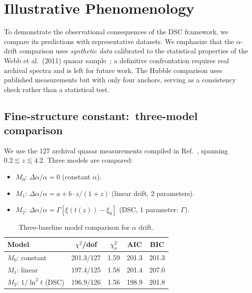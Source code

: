 \documentclass[twocolumn,showpacs,preprintnumbers,amsmath,amssymb,prd]{revtex4-2}
\newcommand{\lnq}{\ln^2}
\begin{document}
\section{Illustrative Phenomenology}\label{sec:data}

To demonstrate the observational consequences of the DSC framework,
we compare its predictions with representative datasets.
We emphasize that the $\alpha$-drift comparison uses
\emph{synthetic data} calibrated to the statistical properties of
the Webb et al.\ (2011) quasar sample~\cite{Webb2011,Murphy2003};
a definitive confrontation requires real archival spectra and is
left for future work.
The Hubble comparison uses published measurements but with only
four anchors, serving as a consistency check rather than a
statistical test.

\subsection{Fine-structure constant:\ three-model comparison}
\label{sec:data_alpha}

We use the 127 archival quasar measurements compiled in
Ref.~\cite{Webb2011,Murphy2003}, spanning
$0.2 \lesssim z \lesssim 4.2$.
Three models are compared:
\begin{itemize}
  \item $M_0$: $\Delta\alpha/\alpha = 0$ (constant $\alpha$).
  \item $M_1$: $\Delta\alpha/\alpha = a + b\cdot z/(1+z)$
    (linear drift, 2 parameters).
  \item $M_2$: $\Delta\alpha/\alpha = \Gamma[\xi(t(z)) - \xi_0]$
    (DSC, 1 parameter: $\Gamma$).
\end{itemize}

\begin{table}[h]
\caption{Three-baseline model comparison for $\alpha$ drift.}
\label{tab:alpha}
\begin{ruledtabular}
\begin{tabular}{lcccc}
 Model & $\chi^2$/dof & $\chi^2_\nu$ & AIC & BIC \\
\hline
$M_0$: constant & 201.3/127 & 1.59 & 201.3 & 201.3 \\
$M_1$: linear   & 197.4/125 & 1.58 & 201.4 & 207.0 \\
$M_2$: $1/\lnq t$ (DSC) & 196.9/126 & 1.56 & 198.9 & 201.8 \\
\end{tabular}
\end{ruledtabular}
\end{table}
\end{document}
